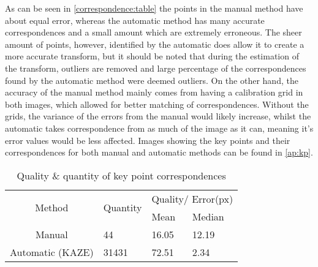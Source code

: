 As can be seen in \autoref{correspondence:table} the points in the manual method have about equal error, whereas the automatic method has many accurate correspondences and a small amount which are extremely erroneous. The sheer amount of points, however, identified by the automatic does allow it to create a more accurate transform, but it should be noted that during the estimation of the transform, outliers are removed and large percentage of the correspondences found by the automatic method were deemed outliers. On the other hand, the accuracy of the manual method mainly comes from having a calibration grid in both images, which allowed for better matching of correspondences. Without the grids, the variance of the errors from the manual would likely increase, whilst the automatic takes correspondence from as much of the image as it can, meaning it's error values would be less affected. Images showing the key points and their correspondences for both manual and automatic methods can be found in \autoref{ap:kp}.


\begin{table}[]
   \begin{tabular}{c|l|ll}
   \multirow{2}{*}{Method} & \multirow{2}{*}{Quantity} & \multicolumn{2}{c}{Quality/ Error(px)}        \\ \cline{3-4} 
                           &                           & \multicolumn{1}{l|}{Mean} & Median \\ \hline
   Manual                  & 44                       & \multicolumn{1}{l|}{16.05}  & 12.19    \\
   Automatic (KAZE)        & 31431                       & \multicolumn{1}{l|}{72.51}  & 2.34   
\end{tabular}
\caption{Quality \& quantity of key point correspondences}
\label{correspondence:table}
\end{table}